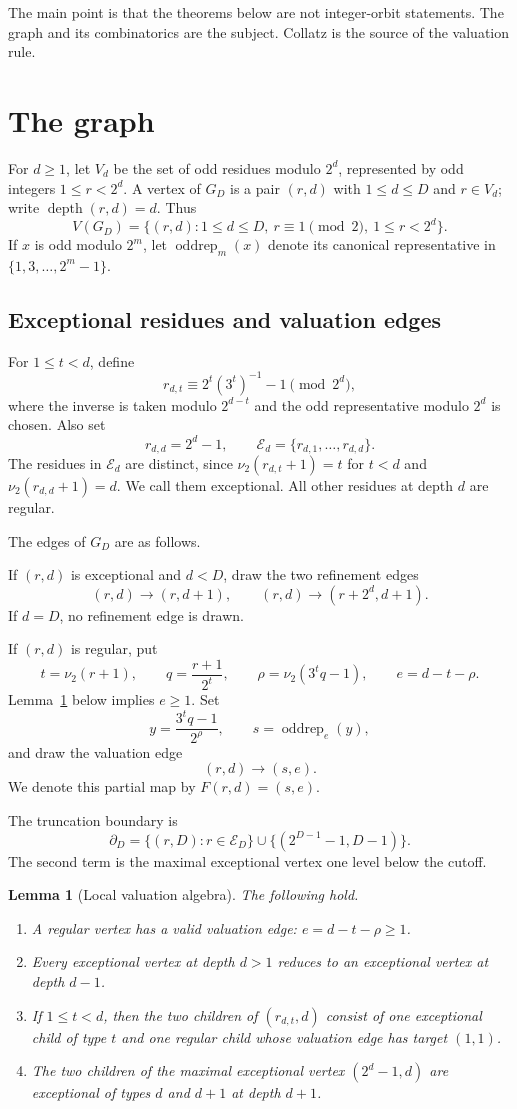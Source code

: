 \documentclass[11pt]{article}
\newtheorem{lemma}[theorem]{Lemma}
\theoremstyle{definition}
\theoremstyle{remark}
\newcommand{\nuu}{\nu_2}
\newcommand{\Ecal}{\mathcal E}
\newcommand{\bdD}{\partial_D}
\newcommand{\depth}{\operatorname{depth}}
\newcommand{\oddrep}{\operatorname{oddrep}}
\begin{document}
The main point is that the theorems below are not integer-orbit statements.  The graph and its combinatorics are the subject.  Collatz is the source of the valuation rule.

\section{The graph}\label{sec:graph}

For $d\ge1$, let $V_d$ be the set of odd residues modulo $2^d$, represented by odd integers $1\le r<2^d$.  A vertex of $G_D$ is a pair $(r,d)$ with $1\le d\le D$ and $r\in V_d$; write $\depth(r,d)=d$.  Thus
\[
V(G_D)=\{(r,d):1\le d\le D,\ r\equiv1\pmod2,\ 1\le r<2^d\}.
\]
If $x$ is odd modulo $2^m$, let $\oddrep_m(x)$ denote its canonical representative in $\{1,3,\ldots,2^m-1\}$.

\subsection{Exceptional residues and valuation edges}

For $1\le t<d$, define
\[
r_{d,t}\equiv 2^t(3^t)^{-1}-1\pmod {2^d},
\]
where the inverse is taken modulo $2^{d-t}$ and the odd representative modulo $2^d$ is chosen.  Also set
\[
r_{d,d}=2^d-1,
\qquad
\Ecal_d=\{r_{d,1},\ldots,r_{d,d}\}.
\]
The residues in $\Ecal_d$ are distinct, since $\nuu(r_{d,t}+1)=t$ for $t<d$ and $\nuu(r_{d,d}+1)=d$.  We call them exceptional.  All other residues at depth $d$ are regular.

The edges of $G_D$ are as follows.

If $(r,d)$ is exceptional and $d<D$, draw the two refinement edges
\[
(r,d)\to(r,d+1),\qquad (r,d)\to(r+2^d,d+1).
\]
If $d=D$, no refinement edge is drawn.

If $(r,d)$ is regular, put
\[
t=\nuu(r+1),\qquad q=\frac{r+1}{2^t},\qquad
\rho=\nuu(3^tq-1),\qquad e=d-t-\rho.
\]
Lemma~\ref{lem:local} below implies $e\ge1$.  Set
\[
y=\frac{3^tq-1}{2^\rho},\qquad s=\oddrep_e(y),
\]
and draw the valuation edge
\[
(r,d)\to(s,e).
\]
We denote this partial map by $F(r,d)=(s,e)$.

The truncation boundary is
\[
\bdD=\{(r,D):r\in\Ecal_D\}\cup\{(2^{D-1}-1,D-1)\}.
\]
The second term is the maximal exceptional vertex one level below the cutoff.

\begin{lemma}[Local valuation algebra]\label{lem:local}
The following hold.
\begin{enumerate}
\item A regular vertex has a valid valuation edge: $e=d-t-\rho\ge1$.
\item Every exceptional vertex at depth $d>1$ reduces to an exceptional vertex at depth $d-1$.
\item If $1\le t<d$, then the two children of $(r_{d,t},d)$ consist of one exceptional child of type $t$ and one regular child whose valuation edge has target $(1,1)$.
\item The two children of the maximal exceptional vertex $(2^d-1,d)$ are exceptional of types $d$ and $d+1$ at depth $d+1$.
\end{enumerate}
\end{lemma}
\end{document}
